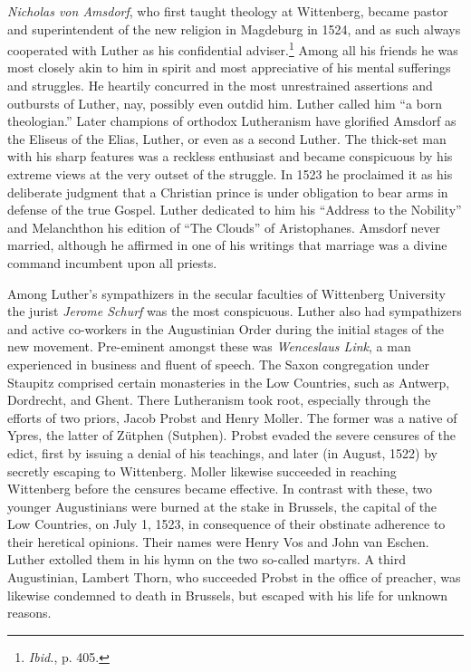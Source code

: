 \textit{Nicholas von Amsdorf}, who first taught theology at Wittenberg,
became pastor and superintendent of the new religion in Magdeburg
in 1524, and as such always cooperated with Luther as his confidential
adviser.\footnote{\textit{Ibid.}, p. 405.}
Among all his friends he was most closely akin
to him in spirit and most appreciative of his mental sufferings and
struggles. He heartily concurred in the most unrestrained assertions
and outbursts of Luther, nay, possibly even outdid him. Luther
called him “a born theologian.” Later champions of orthodox
Lutheranism have glorified Amsdorf as the Eliseus of the Elias,
Luther, or even as a second Luther. The thick-set man with his
sharp features was a reckless enthusiast and became conspicuous by
his extreme views at the very outset of the struggle. In 1523 he
proclaimed it as his deliberate judgment that a Christian prince
is under obligation to bear arms in defense of the true Gospel. Luther
dedicated to him his “Address to the Nobility” and Melanchthon
his edition of “The Clouds” of Aristophanes. Amsdorf never married,
although he affirmed in one of his writings that marriage was a
divine command incumbent upon all priests.

Among Luther’s sympathizers in the secular faculties of Wittenberg University
the jurist \textit{Jerome Schurf} was the most conspicuous.
Luther also had sympathizers and active co-workers in the Augustinian
Order during the initial stages of the new movement.
Pre-eminent amongst these was \textit{Wenceslaus Link}, a man experienced
in business and fluent of speech. The Saxon congregation under
Staupitz comprised certain monasteries in the Low Countries, such
as Antwerp, Dordrecht, and Ghent. There Lutheranism took root,
especially through the efforts of two priors, Jacob Probst and Henry
Moller. The former was a native of Ypres, the latter of Zütphen
(Sutphen). Probst evaded the severe censures of the edict, first by
issuing a denial of his teachings, and later (in August, 1522) by secretly
escaping to Wittenberg. Moller likewise succeeded in reaching
Wittenberg before the censures became effective. In contrast with
these, two younger Augustinians were burned at the stake in Brussels,
the capital of the Low Countries, on July 1, 1523, in consequence
of their obstinate adherence to their heretical opinions. Their names
were Henry Vos and John van Eschen. Luther extolled them in his
hymn on the two so-called martyrs. A third Augustinian, Lambert
Thorn, who succeeded Probst in the office of preacher, was likewise condemned
to death in Brussels, but escaped with his life for
unknown reasons.

